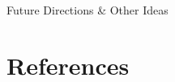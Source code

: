 \documentclass[serif, aspectratio=169]{beamer}
\begin{document}
\begin{frame}{Future Directions \& Other Ideas}
	
\end{frame}

%	



\section{References}




%    


\end{document}
